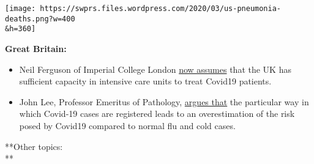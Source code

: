 \texttt{[image: https://swprs.files.wordpress.com/2020/03/us-pneumonia-deaths.png?w=400\\\&h=360]}

\textbf{Great Britain:}

\begin{itemize}
\tightlist
\item
  Neil Ferguson of Imperial College London
  \href{https://www.newscientist.com/article/2238578-uk-has-enough-intensive-care-units-for-coronavirus-expert-predicts/}{now
  assumes} that the UK has sufficient capacity in intensive care units
  to treat Covid19 patients.
\item
  John Lee, Professor Emeritus of Pathology,
  \href{https://www.spectator.co.uk/article/The-evidence-on-Covid-19-is-not-as-clear-as-we-think}{argues
  that} the particular way in which Covid-19 cases are registered leads
  to an overestimation of the risk posed by Covid19 compared to normal
  flu and cold cases.
\end{itemize}

**Other topics:\\
**

